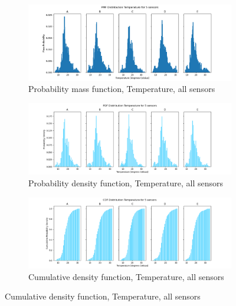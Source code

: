 \documentclass{report}
\begin{document}
	\begin{figure}[H]
		\centering
		\begin{subfigure}[b]{0.85\linewidth}
			\includegraphics[width=\linewidth]{GEO1001_hw01_images/GEO1001_hw01_A2_PMF.png}
			\caption{Probability mass function, Temperature, all sensors}
			\label{fig:pmf}
		\end{subfigure}
		
		\begin{subfigure}[b]{0.85\linewidth}
			\includegraphics[width=\linewidth]{GEO1001_hw01_images/GEO1001_hw01_A2_PDF.png}
			\caption{Probability density function, Temperature, all sensors}
			\label{fig:pdf}
		\end{subfigure}
		
		\begin{subfigure}[b]{0.85\linewidth}
			\includegraphics[width=\linewidth]{GEO1001_hw01_images/GEO1001_hw01_A2_CDF.png}
			\caption{Cumulative density function, Temperature, all sensors}
			\label{fig:cdf}
		\end{subfigure}
	\end{figure}
	
\end{document}
